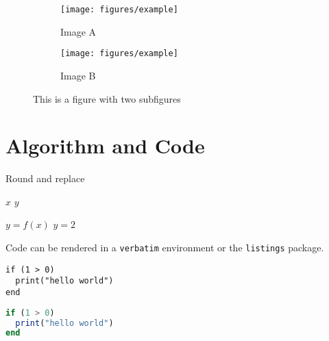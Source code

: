 \begin{figure}
	\begin{subfigure}[h]{0.4\linewidth}
		\texttt{[image: figures/example]}
		\caption{Image A}
	\end{subfigure}
		\hfill
	\begin{subfigure}[h]{0.4\linewidth}
		\texttt{[image: figures/example]}
		\caption{Image B}
	\end{subfigure}%
\caption{This is a figure with two subfigures}
\end{figure}





\section{Algorithm and Code}
\begin{algorithm}[h]
\caption{Round and replace}\label{alg:21}
\begin{algorithmic}[1] %
	\Require $x$
	\Ensure $y$

	\State $y = f(x)$
		\State $y = 2$
	\EndIf
\end{algorithmic}
\end{algorithm}


Code can be rendered in a {\tt verbatim} environment or the {\tt listings} package.

\begin{verbatim}
if (1 > 0)
  print("hello world")
end
\end{verbatim}

\begin{lstlisting}[language=Octave]
if (1 > 0)
  print("hello world")
end
\end{lstlisting}
